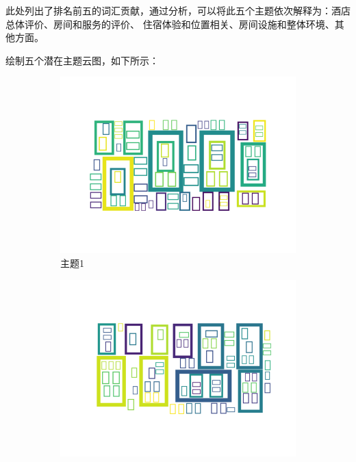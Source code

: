 \documentclass[UTF8,a4paper,15pt,titlepage,oneside]{ctexbook}
\begin{document}
  此处列出了排名前五的词汇贡献，通过分析，可以将此五个主题依次解释为：酒店总体评价、房间和服务的评价、
  住宿体验和位置相关、房间设施和整体环境、其他方面。

  绘制五个潜在主题云图，如下所示：

  \begin{figure}[htbp]
    \centering
    
    \begin{subfigure}{0.32\textwidth}
      \includegraphics[width=\linewidth]{pictures/26.png}
      \caption{主题1}
    \end{subfigure}
    \begin{subfigure}{0.32\textwidth}
      \includegraphics[width=\linewidth]{pictures/27.png}

\end{subfigure}
\end{figure}
\end{document}
